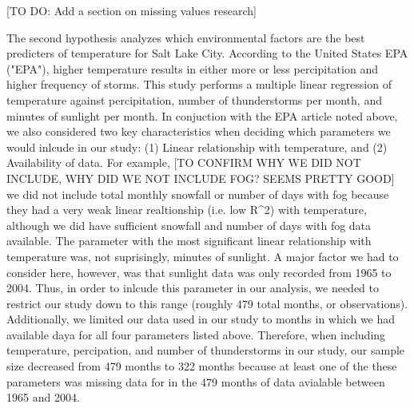 [TO DO: Add a section on missing values research]

The second hypothesis analyzes which environmental factors are the best predicters of temperature for Salt Lake City. According to the United States EPA ("EPA")\cite{epa_utah}, higher temperature results in either more or less percipitation and higher frequency of storms. This study performs a multiple linear regression of temperature against percipitation, number of thunderstorms per month, and minutes of sunlight per month. In conjuction with the EPA article noted above, we also considered two key characteristics when deciding which parameters we would inlcude in our study: (1) Linear relationship with temperature, and (2) Availability of data. For example, [TO CONFIRM WHY WE DID NOT INCLUDE, WHY DID WE NOT INCLUDE FOG? SEEMS PRETTY GOOD] we did not include total monthly snowfall or number of days with fog because they had a very weak linear realtionship (i.e. low R^2) with temperature, although we did have sufficient snowfall and number of days with fog data available. The parameter with the most significant linear relationship with temperature was, not suprisingly, minutes of sunlight. A major factor we had to consider here, however, was that sunlight data was only recorded from 1965 to 2004. Thus, in order to inlcude this parameter in our analysis, we needed to restrict our study down to this range (roughly 479 total months, or observations). Additionally, we limited our data used in our study to months in which we had available daya for all four parameters listed above. Therefore, when including temperature, percipation, and number of thunderstorms in our study, our sample size decreased from 479 months to 322 months because at least one of the these parameters was missing data for in the 479 months of data avialable between 1965 and 2004.


